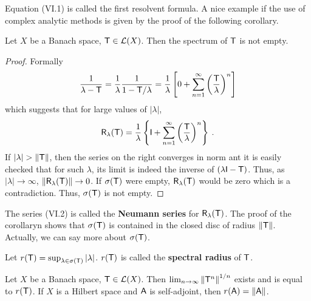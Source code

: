 Equation (VI.1) is called the first resolvent formula. A nice example if the use of complex analytic methods is given by the proof of the following corollary.

\begin{corollary}
    Let $X$ be a Banach space, $\mathsf{T} \in \mathcal L(X)$. Then the spectrum of $\mathsf{T}$ is not empty.
\end{corollary}

\begin{proof}
    Formally
    \begin{align}
        \frac{1}{\lambda - \mathsf{T}} = \frac{1}{\lambda} \frac{1}{1 - \mathsf{T}/\lambda} = \frac{1}{\lambda} \left[ 0 + \sum_{n=1}^\infty \left(  \frac{\mathsf{T}}{\lambda} \right)^n \right]
    \end{align}
    which suggests that for large values of $|\lambda|$,
    \begin{align}
        \mathsf{R}_\lambda (\mathsf{T}) = \frac{1}{\lambda} \left\lbrace \mathsf{I} + \sum_{n=1}^\infty \left( \frac{\mathsf{T}}{\lambda} \right)^n \right\rbrace \:.
    \end{align}
    If $|\lambda| > \left \Vert \mathsf{T} \right \Vert$, then the series on the right converges in norm ant it is easily checked that for such $\lambda$, its limit is indeed the inverse of $(\lambda \mathsf{I} - \mathsf{T})$. Thus, as $|\lambda| \rightarrow \infty$, $\left \Vert \mathsf{R}_\lambda ( \mathsf{T}) \right \Vert \rightarrow 0$. If $\sigma(\mathsf{T})$ were empty, $\mathsf{R}_\lambda( \mathsf{T} )$ would be zero which is a contradiction. Thus, $\sigma(\mathsf{T})$ is not empty.
\end{proof}

The series (VI.2) is called the \textbf{Neumann series} for $\mathsf{R}_\lambda( \mathsf{T} )$. The proof of the corollaryn shows that $\sigma(\mathsf{T})$ is contained in the closed disc of radius $\left \Vert \mathsf{T} \right \Vert$.
Actually, we can say more about $\sigma(\mathsf{T})$.

\begin{definition}
    Let $r(\mathsf{T}) = \sup_{\lambda \in \sigma(\mathsf{T})} |\lambda |$. $r(\mathsf{T})$ is called the \textbf{spectral radius} of $\mathsf{T}$.
\end{definition}

\begin{theorem}
    Let $X$ be a Banach space, $\mathsf{T} \in \mathcal L(X)$. Then $\lim_{n \rightarrow \infty} \left \Vert \mathsf{T}^n \right \Vert^{1/n}$ exists and is equal to $r(\mathsf{T})$. If $X$ is a Hilbert space and $\mathsf{A}$ is self-adjoint, then $r(\mathsf{A}) = \left \Vert \mathsf{A} \right \Vert$.
\end{theorem}

